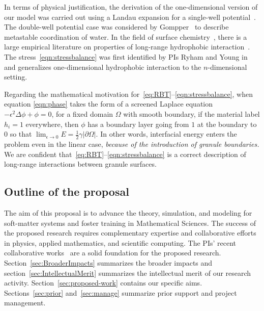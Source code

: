 In terms of physical justification, the derivation of the
one-dimensional version of our model was carried out using a Landau
expansion for a single-well potential~\cite{MaRa76, ErLjCl89}.
The double-well potential case was
considered by Gompper~\cite{GoHaKo94} to describe metastable
coordination of water. In the field of surface
chemistry~\cite{Israelachvili1954}, there is a large empirical
literature on properties of long-range hydrophobic
interaction~\cite{LeRaPa77, KoNa15, Nagle17, Lum1999, Lin2005,
Meyer2006, Ducker2016, Jackson2016, Gletal88, Aketal17, Ch05}. The
stress~\eqref{eqn:stressbalance} was first identified by PIs Ryham and
Young in~\cite{Fu2018_SIAM} and generalizes one-dimensional hydrophobic
interaction to the $n$-dimensional setting. 

Regarding the mathematical motivation for~\eqref{eq:RBT}--\eqref{eqn:stressbalance},
when equation \eqref{eqn:phase} takes the form of a screened Laplace equation
$-\epsilon^2 \Delta \phi + \phi =0$, for a fixed domain $\Omega$ with
smooth boundary, if the material label $h_i = 1$
everywhere, then $\phi$ has a boundary layer going from $1$ at the
boundary to $0$ so that 
$\lim_{\epsilon \to 0} E = \frac{1}{2}\gamma |\partial \Omega|$.
In other words, 
interfacial energy enters the problem even in the linear case,
\emph{because of the introduction of granule boundaries.}
We are confident
that~\eqref{eq:RBT}--\eqref{eqn:stressbalance} is a correct description
of long-range interactions between granule surfaces.


\subsection{Outline of the proposal}
The aim of this proposal is to advance the theory, simulation, and
modeling for soft-matter systems and foster training in Mathematical
Sciences.
The success of the proposed research requires complementary expertise
and collaborative efforts in physics, applied mathematics, and
scientific computing. The PIs' recent collaborative
works~\cite{FuQuRyYo22, fu-ryh-qua-you2022}
are a solid foundation for the proposed research.
Section~\ref{sec:BroaderImpacts} summarizes the broader
impacts and section~\ref{sec:IntellectualMerit} summarizes the
intellectual merit of our research activity.
Section~\ref{sec:proposed-work} contains our specific aims.
Sections~\ref{sec:prior} and~\ref{sec:manage} summarize prior support
and project management.








